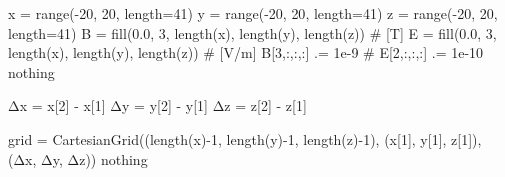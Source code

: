 \documentclass[
  a4paper,
  DIV=11]{scrreprt}
\newenvironment{Shaded}{\begin{snugshade}}{\end{snugshade}}
\newcommand{\CommentTok}[1]{\textcolor[rgb]{0.37,0.37,0.37}{#1}}
\newcommand{\ConstantTok}[1]{\textcolor[rgb]{0.56,0.35,0.01}{#1}}
\newcommand{\FloatTok}[1]{\textcolor[rgb]{0.68,0.00,0.00}{#1}}
\newcommand{\FunctionTok}[1]{\textcolor[rgb]{0.28,0.35,0.67}{#1}}
\newcommand{\NormalTok}[1]{\textcolor[rgb]{0.00,0.23,0.31}{#1}}
\newcommand{\OperatorTok}[1]{\textcolor[rgb]{0.37,0.37,0.37}{#1}}
\begin{document}
\begin{Shaded}
\begin{Highlighting}[]
\NormalTok{x }\OperatorTok{=} \FunctionTok{range}\NormalTok{(}\OperatorTok{{-}}\FloatTok{20}\NormalTok{, }\FloatTok{20}\NormalTok{, length}\OperatorTok{=}\FloatTok{41}\NormalTok{)}
\NormalTok{y }\OperatorTok{=} \FunctionTok{range}\NormalTok{(}\OperatorTok{{-}}\FloatTok{20}\NormalTok{, }\FloatTok{20}\NormalTok{, length}\OperatorTok{=}\FloatTok{41}\NormalTok{)}
\NormalTok{z }\OperatorTok{=} \FunctionTok{range}\NormalTok{(}\OperatorTok{{-}}\FloatTok{20}\NormalTok{, }\FloatTok{20}\NormalTok{, length}\OperatorTok{=}\FloatTok{41}\NormalTok{)}
\NormalTok{B }\OperatorTok{=} \FunctionTok{fill}\NormalTok{(}\FloatTok{0.0}\NormalTok{, }\FloatTok{3}\NormalTok{, }\FunctionTok{length}\NormalTok{(x), }\FunctionTok{length}\NormalTok{(y), }\FunctionTok{length}\NormalTok{(z)) }\CommentTok{\# [T]}
\NormalTok{E }\OperatorTok{=} \FunctionTok{fill}\NormalTok{(}\FloatTok{0.0}\NormalTok{, }\FloatTok{3}\NormalTok{, }\FunctionTok{length}\NormalTok{(x), }\FunctionTok{length}\NormalTok{(y), }\FunctionTok{length}\NormalTok{(z)) }\CommentTok{\# [V/m]}
\NormalTok{B[}\FloatTok{3}\NormalTok{,}\OperatorTok{:}\NormalTok{,}\OperatorTok{:}\NormalTok{,}\OperatorTok{:}\NormalTok{] }\OperatorTok{.=} \FloatTok{1e{-}9}
\CommentTok{\# E[2,:,:,:] .= 1e{-}10}
\ConstantTok{nothing}
\end{Highlighting}
\end{Shaded}

\begin{Shaded}
\begin{Highlighting}[]
\NormalTok{Δx }\OperatorTok{=}\NormalTok{ x[}\FloatTok{2}\NormalTok{] }\OperatorTok{{-}}\NormalTok{ x[}\FloatTok{1}\NormalTok{]}
\NormalTok{Δy }\OperatorTok{=}\NormalTok{ y[}\FloatTok{2}\NormalTok{] }\OperatorTok{{-}}\NormalTok{ y[}\FloatTok{1}\NormalTok{]}
\NormalTok{Δz }\OperatorTok{=}\NormalTok{ z[}\FloatTok{2}\NormalTok{] }\OperatorTok{{-}}\NormalTok{ z[}\FloatTok{1}\NormalTok{]}

\NormalTok{grid }\OperatorTok{=} \FunctionTok{CartesianGrid}\NormalTok{((}\FunctionTok{length}\NormalTok{(x)}\OperatorTok{{-}}\FloatTok{1}\NormalTok{, }\FunctionTok{length}\NormalTok{(y)}\OperatorTok{{-}}\FloatTok{1}\NormalTok{, }\FunctionTok{length}\NormalTok{(z)}\OperatorTok{{-}}\FloatTok{1}\NormalTok{),}
\NormalTok{   (x[}\FloatTok{1}\NormalTok{], y[}\FloatTok{1}\NormalTok{], z[}\FloatTok{1}\NormalTok{]),}
\NormalTok{   (Δx, Δy, Δz))}
\ConstantTok{nothing}
\end{Highlighting}
\end{Shaded}
\end{document}
